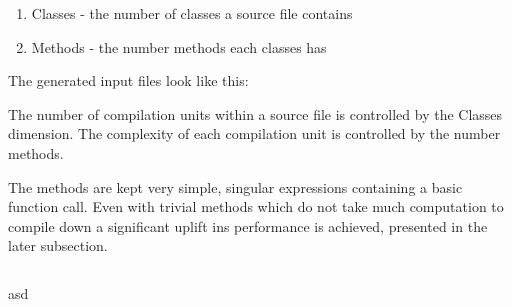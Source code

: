\documentclass{VUMIFPSbakalaurinis}
\begin{document}
\begin{enumerate}
\item{Classes - the number of classes a source file contains}
\item{Methods - the number methods each classes has}
\end{enumerate}

The generated input files look like this:



The number of compilation units within a source file is controlled by the Classes dimension. The complexity of each compilation unit is controlled by the number methods.

The methods are kept very simple, singular expressions containing a basic function call.
Even with trivial methods which do not take much computation to compile down a significant uplift ins performance is achieved, presented in the later subsection.

\begin{center}
\begin{tabular}{ c | c | c | c | c | c }

\end{tabular}
\end{center}

\begin{figure}
\end{figure}

asd

\begin{figure}
\end{figure}
\end{document}
